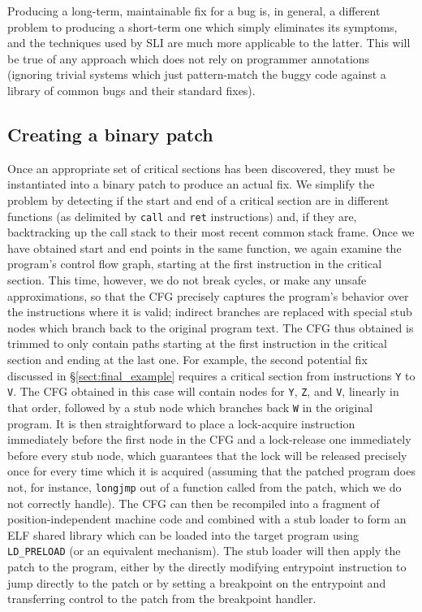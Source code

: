 \documentclass[10pt,twocolumn,preprint,natbib,authoryear]{sigplanconf}
\begin{document}
Producing a long-term, maintainable fix for a bug is, in general, a
different problem to producing a short-term one which simply
eliminates its symptoms, and the techniques used by SLI are much more
applicable to the latter.  This will be true of any approach which
does not rely on programmer annotations (ignoring trivial systems
which just pattern-match the buggy code against a library of common
bugs and their standard fixes).


\subsection{Creating a binary patch}
\label{sect:binpatch}

Once an appropriate set of critical sections has been discovered, they
must be instantiated into a binary patch to produce an actual fix.  We
simplify the problem by detecting if the start and end of a critical
section are in different functions (as delimited by \verb|call| and
\verb|ret| instructions) and, if they are, backtracking up the call
stack to their most recent common stack frame.  Once we have obtained
start and end points in the same function, we again examine the
program's control flow graph, starting at the first instruction in the
critical section.  This time, however, we do not break cycles, or make
any unsafe approximations, so that the CFG precisely captures the
program's behavior over the instructions where it is valid; indirect
branches are replaced with special stub nodes which branch back to the
original program text.  The CFG thus obtained is trimmed to only
contain paths starting at the first instruction in the critical
section and ending at the last one.  For example, the second potential
fix discussed in \S\ref{sect:final_example} requires a critical
section from instructions \verb|Y| to \verb|V|.  The CFG obtained in
this case will contain nodes for \verb|Y|, \verb|Z|, and \verb|V|,
linearly in that order, followed by a stub node which branches back
\verb|W| in the original program.  It is then straightforward to place
a lock-acquire instruction immediately before the first node in the
CFG and a lock-release one immediately before every stub node, which
guarantees that the lock will be released precisely once for every
time which it is acquired (assuming that the patched program does not,
for instance, \verb|longjmp| out of a function called from the patch,
which we do not correctly handle).  The CFG can then be recompiled
into a fragment of position-independent machine code and combined with
a stub loader to form an ELF shared library which can be loaded into
the target program using \verb|LD_PRELOAD| (or an equivalent
mechanism).  The stub loader will then apply the patch to the program,
either by the directly modifying entrypoint instruction to jump
directly to the patch or by setting a breakpoint on the entrypoint and
transferring control to the patch from the breakpoint handler.
\end{document}
